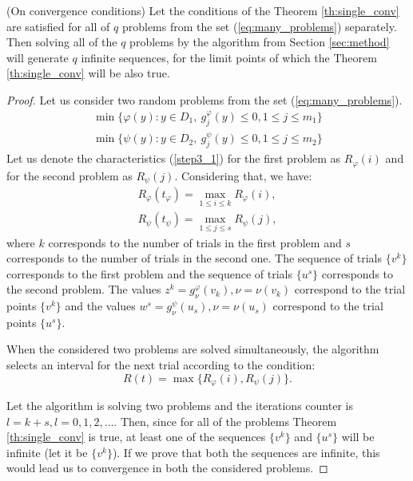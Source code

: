 \documentclass[runningheads]{llncs}
\begin{document}
\begin{theorem} (On convergence conditions) Let the conditions of the Theorem \ref{th:single_conv}
  are satisfied for all of \(q\) problems from the set (\ref{eq:many_problems}) separately.
  Then solving all of the \(q\) problems by the algorithm from Section \ref{sec:method} will
  generate \(q\) infinite sequences, for the limit points of which the Theorem \ref{th:single_conv}
  will be also true.
\end{theorem}
\begin{proof}
  Let us consider two random problems from the set (\ref{eq:many_problems}).
  \begin{equation}
      \begin{array}{lr}
        \min\{\varphi(y):y\in D_1,\: g_j^\varphi(y)\leqslant 0, 1\leqslant j\leqslant m_1\} \\
        \min\{\psi(y):y\in D_2,\: g_j^\psi(y)\leqslant 0, 1\leqslant j\leqslant m_2\}
      \end{array}
  \end{equation}
  Let us denote the characteristics (\ref{step3_1}) for the first problem as \(R_\varphi(i)\)
  and for the second problem as \(R_\psi(j)\). Considering that, we have:
  \begin{equation}
      \begin{array}{lr}
        R_\varphi(t_\varphi)=\max_{1\leqslant i\leqslant k}R_\varphi(i), \\
        R_\psi(t_\psi)=\max_{1\leqslant j\leqslant s}R_\psi(j),
      \end{array}
  \end{equation}
  where \(k\) corresponds to the number of trials in the first problem and \(s\)
  corresponds to the number of trials in the second one. The sequence of trials \(\{v^k\}\)
  corresponds to the first problem and the sequence of trials \(\{u^s\}\)
  corresponds to the second problem. The values \(z^k=g^\varphi_\nu(v_k),\nu =\nu (v_{k})\) correspond to the
  trial points \(\{v^k\}\) and the values \(w^s=g^\psi_\nu(u_s),\nu =\nu(u_{s})\) correspond to the
  trial points \(\{u^s\}\).

  When the considered two problems are solved simultaneously, the algorithm selects
  an interval for the next trial according to the condition:
  \begin{equation}
    R(t) = \max\{R_\varphi(i),R_\psi(j)\}.
  \end{equation}

  Let the algorithm is solving two problems and the iterations counter is \(l = k + s, l=0,1,2,\dots\).
  Then, since for all of the problems Theorem \ref{th:single_conv} is true, at least one of the sequences
  \(\{v^k\}\) and \(\{u^s\}\) will be infinite (let it be \(\{v^k\}\)). If we prove that both the
  sequences are infinite, this would lead us to convergence in both the considered problems.


\end{proof}
\end{document}
